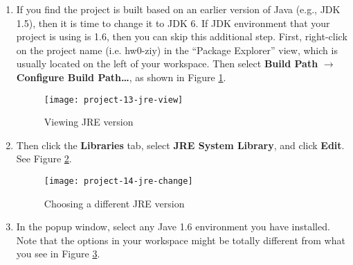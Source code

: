 \begin{enumerate}
\begin{center}
\textbf{edu.cmu.lti.11791.f12.hw0}
\end{center}

and the Artifact Id should be

\begin{center}
\textbf{hw0-ANDREW\_ID}
\end{center}

Replace \textbf{ANDREW\_ID} with your Andrew ID. You must type in the correct information to create your artifact, since both Group Id and Artifact Id will be used to generate the jar file and eventually submit the jar to the correct folder in our Maven repository. You do not need to change the rest of the configuration, and press \textbf{Finish} to complete creating the Maven project. On some platforms\footnote{For example, Windows XP/Helios as reported by Martin van Velsen}, you will need to fill in a Name and Description otherwise the wizard will generate an error.

\begin{figure}[t]
\centering
\texttt{[image: project-12-jre]}
\caption{Configuring Build Path\label{project-12-jre}}
\end{figure}

\item If you find the project is built based on an earlier version of Java (e.g., JDK 1.5), then it is time to change it to JDK 6. If JDK environment that your project is using is 1.6, then you can skip this additional step. First, right-click on the project name (i.e. hw0-ziy) in the ``Package Explorer'' view, which is usually located on the left of your workspace. Then select \textbf{Build Path} $\rightarrow$ \textbf{Configure Build Path\ldots}, as shown in Figure \ref{project-12-jre}.

\begin{figure}[t]
\centering
\texttt{[image: project-13-jre-view]}
\caption{Viewing JRE version\label{project-13-jre-view}}
\end{figure}

\item Then click the \textbf{Libraries} tab, select \textbf{JRE System Library}, and click \textbf{Edit}. See Figure \ref{project-13-jre-view}.

\begin{figure}[t]
\centering
\texttt{[image: project-14-jre-change]}
\caption{Choosing a different JRE version\label{project-14-jre-change}}
\end{figure}

\item In the popup window, select any Jave 1.6 environment you have installed. Note that the options in your workspace might be totally different from what you see in Figure \ref{project-14-jre-change}.

\end{enumerate}

